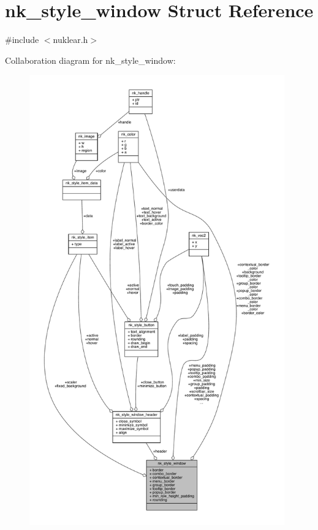 \hypertarget{structnk__style__window}{}\section{nk\+\_\+style\+\_\+window Struct Reference}
\label{structnk__style__window}


{\ttfamily \#include $<$nuklear.\+h$>$}



Collaboration diagram for nk\+\_\+style\+\_\+window\+:
\nopagebreak
\begin{figure}[H]
\begin{center}
\leavevmode
\includegraphics[height=550pt]{structnk__style__window__coll__graph}
\end{center}
\end{figure}
